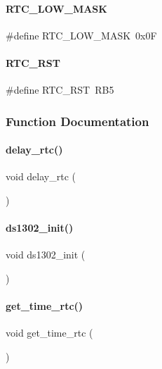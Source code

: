 \paragraph{R\+T\+C\+\_\+\+L\+O\+W\+\_\+\+M\+A\+SK}
{\footnotesize\ttfamily \#define R\+T\+C\+\_\+\+L\+O\+W\+\_\+\+M\+A\+SK~0x0F}

\mbox{\label{a00017_a1615ada9d76f57d41ce419e9e1e25c8b}} 
\paragraph{R\+T\+C\+\_\+\+R\+ST}
{\footnotesize\ttfamily \#define R\+T\+C\+\_\+\+R\+ST~R\+B5}



\subsubsection{Function Documentation}
\mbox{\label{a00017_a30a11d605a2fcfe8fc79c4f0a17a20cf}} 
\paragraph{delay\+\_\+rtc()}
{\footnotesize\ttfamily void delay\+\_\+rtc (\begin{DoxyParamCaption}{ }\end{DoxyParamCaption})}

\mbox{\label{a00017_a0665eb059e742e4bb5a419144336e147}} 
\paragraph{ds1302\+\_\+init()}
{\footnotesize\ttfamily void ds1302\+\_\+init (\begin{DoxyParamCaption}{ }\end{DoxyParamCaption})}

\mbox{\label{a00017_a628868f4036626e8fa1b055bf56dc2f1}} 
\paragraph{get\+\_\+time\+\_\+rtc()}
{\footnotesize\ttfamily void get\+\_\+time\+\_\+rtc (\begin{DoxyParamCaption}{ }\end{DoxyParamCaption})}

